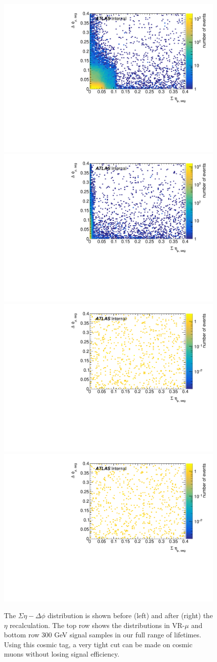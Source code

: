\begin{figure}[!ht]
\centering
\includegraphics[width=.48\textwidth]{figures/cosmics/v4_widetag_2_sumEta_dPhi_min.pdf}
\includegraphics[width=.48\textwidth]{figures/cosmics/v4_widetag_2_sumEta_dPhi_min_corr.pdf}
\includegraphics[width=.48\textwidth]{figures/cosmics/300_slep_2_sumEta_dPhi_min.pdf}
\includegraphics[width=.48\textwidth]{figures/cosmics/300_slep_2_sumEta_dPhi_min_corr.pdf}
\caption{The $\Sigma\eta - \Delta\phi$ distribution is shown before (left) and after (right) the $\eta$ recalculation. The top row shows the distributions in VR-$\mu$ and bottom row 300 GeV \slep signal samples in our full range of lifetimes. Using this cosmic tag, a very tight cut can be made on cosmic muons without losing signal efficiency.}
\label{fig:cos_eta_phi}
\end{figure}


